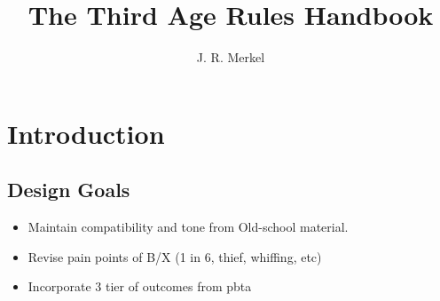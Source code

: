 \documentclass[18pt]{article}
\title{\fontsize{70}{80} \selectfont The Third Age Rules Handbook}
\author{J. R. Merkel}
\date{}
\begin{document}
\sffamily
\large
\frenchspacing
\singlespacing
\parskip=0pt
\parindent=0pt
\lstset{aboveskip=0pt, belowskip=0pt}


\maketitle
\thispagestyle{empty}
\pagebreak
\thispagestyle{empty}
\tableofcontents
\pagebreak
\section*{Introduction}

\subsection*{Design Goals}
\begin{itemize}
	\item Maintain compatibility and tone from Old-school material.
        \item Revise pain points of B/X (1 in 6, thief, whiffing, etc)
        \item Incorporate 3 tier of outcomes from pbta
\end{itemize}

\end{document}
